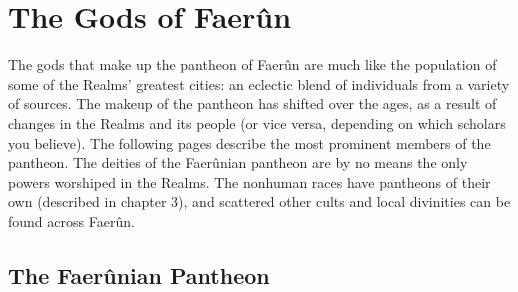 \documentclass[10pt,a4paper,twoside,twocolumn,openany,bg=print,nodeprecatedcode]{dndbook}
\begin{document}
\section{The Gods of Faerûn}
The gods that make up the pantheon of Faerûn are much like the population of some of the Realms' greatest cities: an eclectic blend of individuals from a variety of sources. The makeup of the pantheon has shifted over the ages, as a result of changes in the Realms and its people (or vice versa, depending on which scholars you believe). The following pages describe the most prominent members of the pantheon.
The deities of the Faerûnian pantheon are by no means the only powers worshiped in the Realms. The nonhuman races have pantheons of their own (described in chapter 3), and scattered other cults and local divinities can be found across Faerûn.
\subsection{The Faerûnian Pantheon}
\end{document}
